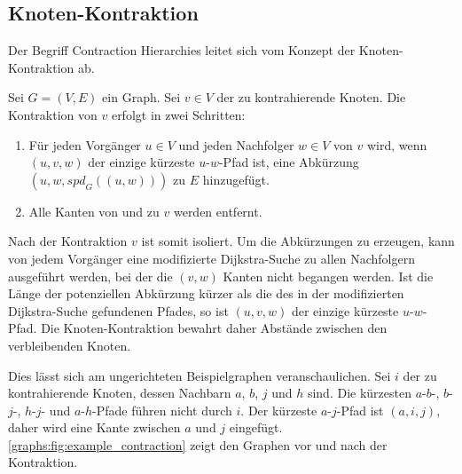 \subsection{Knoten-Kontraktion}

Der Begriff Contraction Hierarchies leitet sich vom Konzept der Knoten-Kontraktion ab.

\begin{definition}
  Sei $G = (V, E)$ ein Graph. Sei $v \in V$ der zu kontrahierende Knoten. Die Kontraktion von $v$ erfolgt in zwei Schritten:

  \begin{enumerate}
    \item\label{ch:contraction:when_shortcut}
    Für jeden Vorgänger $u \in V$ und jeden Nachfolger $w \in V$ von $v$ wird, wenn $(u, v, w)$ der einzige kürzeste $u$-$w$-Pfad ist, eine Abkürzung $(u, w, {spd}_G((u, w)))$ zu $E$ hinzugefügt.

    \item
          Alle Kanten von und zu $v$ werden entfernt.
  \end{enumerate}
\end{definition}

Nach der Kontraktion $v$ ist somit isoliert.
Um die Abkürzungen zu erzeugen, kann von jedem Vorgänger eine modifizierte Dijkstra-Suche zu allen Nachfolgern ausgeführt werden, bei der die $(v, w)$ Kanten nicht begangen werden.
Ist die Länge der potenziellen Abkürzung kürzer als die des in der modifizierten Dijkstra-Suche gefundenen Pfades, so ist $(u, v, w)$ der einzige kürzeste $u$-$w$-Pfad.
Die Knoten-Kontraktion bewahrt daher Abstände zwischen den verbleibenden Knoten.

Dies lässt sich am ungerichteten Beispielgraphen veranschaulichen.
Sei $i$ der zu kontrahierende Knoten, dessen Nachbarn $a$, $b$, $j$ und $h$ sind.
Die kürzesten $a$-$b$-, $b$-$j$-, $h$-$j$- und $a$-$h$-Pfade führen nicht durch $i$.
Der kürzeste $a$-$j$-Pfad ist $(a, i, j)$, daher wird eine Kante zwischen $a$ und $j$ eingefügt.
\autoref{graphs:fig:example_contraction} zeigt den Graphen vor und nach der Kontraktion.

